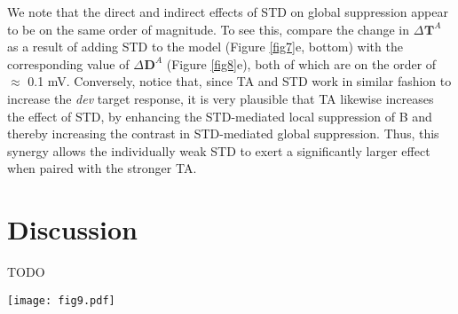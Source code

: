 \documentclass[pdflatex,referee,iicol,sn-basic]{sn-jnl}
\newcommand{\dev}{\textit{dev}}
\renewcommand{\T}[3][]{{}^{#1}_{}\mathbf{T}^{#2}_{#3}}
\newcommand{\D}[3][]{{}^{#1}_{}\!\mathbf{D}^{#2}_{#3}}
\theoremstyle{thmstyleone}%
\theoremstyle{thmstyletwo}%
\theoremstyle{thmstylethree}%
\begin{document}
We note that the direct and indirect effects of STD on global suppression appear to be on the same order of magnitude. To see this, compare the change in $\Delta \T{A}{}$ as a result of adding STD to the model (Figure \ref{fig7}e, bottom) with the corresponding value of $\Delta \D{A}{}$ (Figure \ref{fig8}e), both of which are on the order of $\approx$ 0.1 mV. Conversely, notice that, since TA and STD work in similar fashion to increase the \dev{} target response, it is very plausible that TA likewise increases the effect of STD, by enhancing the STD-mediated local suppression of B and thereby increasing the contrast in STD-mediated global suppression. Thus, this synergy allows the individually weak STD to exert a significantly larger effect when paired with the stronger TA.

\section{Discussion}\label{sec-discussion}

TODO

\begin{figure*}%
    \centering
    \texttt{[image: fig9.pdf]}
    \caption{}
    \label{fig9}
\end{figure*}






\end{document}

